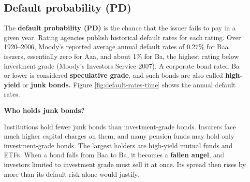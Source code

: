 \subsection{Default probability (PD)}

The \textbf{default probability (PD)} is the chance that the issuer fails to pay in a given year. Rating agencies publish historical default rates for each rating. Over 1920--2006, Moody's reported average annual default rates of 0.27\% 
for Baa issuers, essentially zero for Aaa, and about 1\% for Ba, 
the highest rating below investment grade (Moody's Investors Service 2007). A corporate bond rated Ba or lower is considered \textbf{speculative grade}, and such bonds are also called \textbf{high-yield} or \textbf{junk bonds.} Figure \ref{fig:default-rates-time} shows the annual default rates.

\begin{callout}{\textbf{Who holds junk bonds?}}

Institutions hold fewer junk bonds than investment-grade bonds. Insurers face much higher capital charges on them, and many pension funds may hold only investment-grade bonds. The largest holders are high-yield mutual funds and ETFs. When a bond falls from Baa to Ba, it becomes a \textbf{fallen angel}, and investors limited to investment grade must sell it at once. Its spread then rises by more than its default risk alone would justify.
\end{callout}

